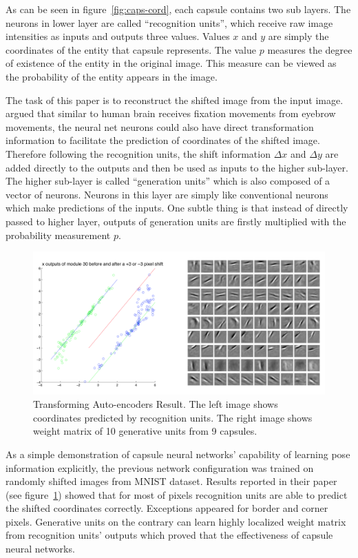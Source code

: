 \documentclass{article} \usepackage{tabularx}
\renewcommand{\citename}{\citet} \renewcommand{\cite}{\citep}
\begin{document}
As can be seen in figure~\ref{fig:caps-cord}, each capsule
contains two sub layers. The neurons in lower layer are called
``recognition units'', which receive raw image intensities as
inputs and outputs three values. Values $x$ and $y$ are simply
the coordinates of the entity that capsule represents. The value
$p$ measures the degree of existence of the entity in the
original image. This measure can be viewed as the probability of
the entity appears in the image. 

The task of this paper is to reconstruct the shifted image from
the input image. \citename{hinton2011transforming} argued that
similar to human brain receives fixation movements from eyebrow
movements, the neural net neurons could also have direct
transformation information to facilitate the prediction of
coordinates of the shifted image. Therefore following the
recognition units, the shift information $\Delta x$ and $\Delta
y$ are added directly to the outputs and then be used as inputs
to the higher sub-layer. The higher sub-layer is called
``generation units'' which is also composed of a vector of
neurons. Neurons in this layer are simply like conventional
neurons which make predictions of the inputs. One subtle thing is
that instead of directly passed to higher layer, outputs of
generation units are firstly multiplied with the probability
measurement $p$.

\begin{figure}
  \centering
  \includegraphics[scale=0.5]{images/trans_caps.png}
  \caption{Transforming Auto-encoders Result. The left image
    shows coordinates predicted by recognition units. The right
    image shows weight matrix of 10 generative units from 9
    capsules.}
  \label{fig:trans_enco}
\end{figure}


As a simple demonstration of capsule neural networks' capability
of learning pose information explicitly, the previous network
configuration was trained on randomly shifted images from MNIST
dataset. Results reported in their paper (see
figure~\ref{fig:trans_enco}) showed that for most of pixels
recognition units are able to predict the shifted coordinates
correctly. Exceptions appeared for border and corner pixels.
Generative units on the contrary can learn highly localized
weight matrix from recognition units' outputs which proved that
the effectiveness of capsule neural networks.
\end{document}
